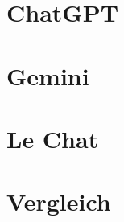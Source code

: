 \section{ChatGPT}  \label{ChatGPT}

\section{Gemini}  \label{Gemini}

\section{Le Chat}  \label{Le Chat}

\section{Vergleich}  \label{Vergleich}